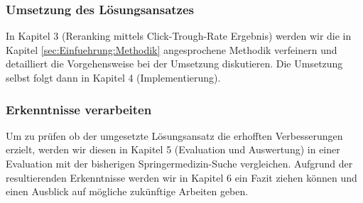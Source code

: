 \subsubsection{Umsetzung des Lösungsansatzes}
\label{sec:Einfuehrung:GliederungAufbau:Umsetzung}

In Kapitel 3 (Reranking mittels Click-Trough-Rate Ergebnis) werden wir die in Kapitel \ref{sec:Einfuehrung:Methodik} angesprochene Methodik verfeinern und detailliert die Vorgehensweise bei der Umsetzung diskutieren. Die Umsetzung selbst folgt dann in Kapitel 4 (Implementierung).

\subsubsection{Erkenntnisse verarbeiten}
\label{sec:Einfuehrung:GliederungAufbau:Erkenntnisse}

Um zu prüfen ob der umgesetzte Lösungsansatz die erhofften Verbesserungen erzielt, werden wir diesen in Kapitel 5 (Evaluation und Auswertung) in einer Evaluation mit der bisherigen Springermedizin-Suche vergleichen. Aufgrund der resultierenden Erkenntnisse werden wir in Kapitel 6 ein Fazit ziehen können und einen Ausblick auf mögliche zukünftige Arbeiten geben.